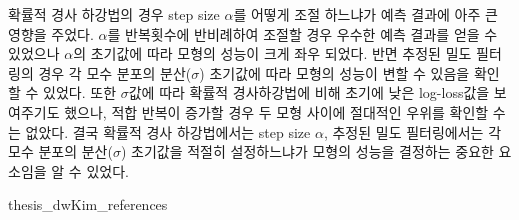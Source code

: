 \documentclass[oneside,b5paper,11pt]{book}
\theoremstyle{plain}
\theoremstyle{definition}
\theoremstyle{remark}
\theoremstyle{definition}
\numberwithin{equation}{chapter}
\begin{document}
 확률적 경사 하강법의 경우 step size $\alpha$를 어떻게 조절 하느냐가 예측 결과에 아주 큰 영향을 주었다. $\alpha$를 반복횟수에 반비례하여 조절할 경우 우수한 예측 결과를 얻을 수 있었으나 $\alpha$의 초기값에 따라 모형의 성능이 크게 좌우 되었다. 반면 추정된 밀도 필터링의 경우 각 모수 분포의 분산($\sigma$) 초기값에 따라 모형의 성능이 변할 수 있음을 확인 할 수 있었다. 또한 $\sigma$값에 따라 확률적 경사하강법에 비해 초기에 낮은 log-loss값을 보여주기도 했으나, 적합 반복이 증가할 경우 두 모형 사이에 절대적인 우위를 확인할 수는 없았다. 결국 확률적 경사 하강법에서는 step size $\alpha$, 추정된 밀도 필터링에서는 각 모수 분포의 분산($\sigma$) 초기값을 적절히 설정하느냐가 모형의 성능을 결정하는 중요한 요소임을 알 수 있었다.










%
%

\newpage
\begin{bibliography}{thesis_dwKim_references}


\end{bibliography}
\end{document}
